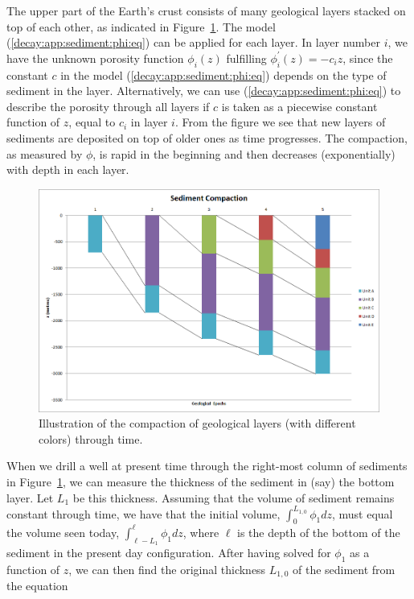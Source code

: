 \documentclass[%
oneside,                 %
final,                   %
10pt]{article}
\begin{document}
The upper part of the Earth's crust consists of many geological layers
stacked on top of each other, as indicated in Figure~\ref{decay:app:sediment:fig:layers}.  The model
(\ref{decay:app:sediment:phi:eq}) can be applied for each layer. In
layer number $i$, we have the unknown porosity function $\phi_i(z)$
fulfilling $\phi_i^{\prime}(z)=-c_iz$, since the constant $c$ in the model
(\ref{decay:app:sediment:phi:eq}) depends on the type of sediment in
the layer. Alternatively, we can use (\ref{decay:app:sediment:phi:eq})
to describe the porosity through all layers if $c$ is taken as a
piecewise constant function of $z$, equal to $c_i$ in layer $i$.
From the figure we see that new layers of sediments are
deposited on top of older ones as time progresses. The compaction,
as measured by $\phi$, is
rapid in the beginning and then decreases (exponentially) with depth
in each layer.


\begin{figure}[!ht]  %
  \centerline{\includegraphics[width=0.9\linewidth]{fig-models/Compaction_of_Sediment.png}}
  \caption{
  Illustration of the compaction of geological layers (with different colors) through time. \label{decay:app:sediment:fig:layers}
  }
\end{figure}


When we drill a well at present time through the right-most column of
sediments in Figure~\ref{decay:app:sediment:fig:layers}, we can measure
the thickness of the sediment in (say) the bottom layer. Let $L_1$ be
this thickness.  Assuming that the volume of sediment remains constant
through time, we have that the initial volume, $\int_0^{L_{1,0}}
\phi_1 dz$, must equal the volume seen today,
$\int_{\ell-L_1}^{\ell}\phi_1 dz$, where $\ell$ is the depth of the
bottom of the sediment in the present day configuration.  After having
solved for $\phi_1$ as a function of $z$, we can then find the
original thickness $L_{1,0}$ of the sediment from the equation
\end{document}
